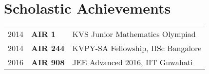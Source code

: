 \documentclass[10pt, margin=0.5in]{deedy-resume-openfont}
\begin{document}
\begin{minipage}[t]{0.48\textwidth}
%
%
\section{Scholastic Achievements}
\vspace{0pt}
\begin{tabular}{lll}
  2014	   & \textbf{AIR 1}  & KVS Junior Mathematics Olympiad\\
  2014	   & \textbf{AIR 244}& KVPY-SA Fellowship, IISc Bangalore \\
  2016     & \textbf{AIR 908}& JEE Advanced 2016, IIT Guwahati \\
\end{tabular}

%


%
%

\end{minipage}
\hfill
\end{document}
